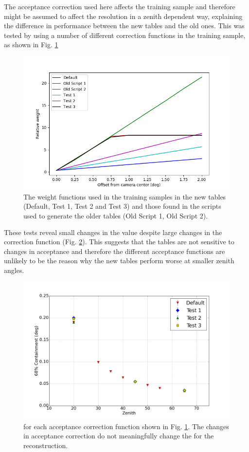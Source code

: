 \documentclass[main.tex]{subfiles}
\begin{document}
The acceptance correction used here affects the training sample and therefore might be assumed to affect the resolution in a zenith dependent way, explaining the difference in performance between the new \disp tables and the old ones. This was tested by using a number of different correction functions in the training sample, as shown in Fig. \ref{fig:weights}

\begin{figure}[htbp]
  \centering
  \includegraphics[width=.78\linewidth]{images/weights}
  \caption[Weight functions for offset from camera center.]{The weight functions used in the training samples in the new tables (Default, Test 1, Test 2 and Test 3) and those found in the scripts used to generate the older tables (Old Script 1, Old Script 2).}
  \label{fig:weights}
\end{figure}

These tests reveal small changes in the \rse value despite large changes in the correction function (Fig. \ref{fig:weight_tests}). This suggests that the \disp tables are not sensitive to changes in acceptance and therefore the different acceptance functions are unlikely to be the reason why the new \disp tables perform worse at smaller zenith angles.

\begin{figure}[htbp]
  \centering
  \includegraphics[width=.75\linewidth]{images/disp_wts_val_xzen}
  \caption[\rse for the acceptance correction functions.]{\rse for each acceptance correction function shown in Fig. \ref{fig:weights}. The changes in acceptance correction do not meaningfully change the \rse for the reconstruction.}
  \label{fig:weight_tests}
\end{figure}
\end{document}
